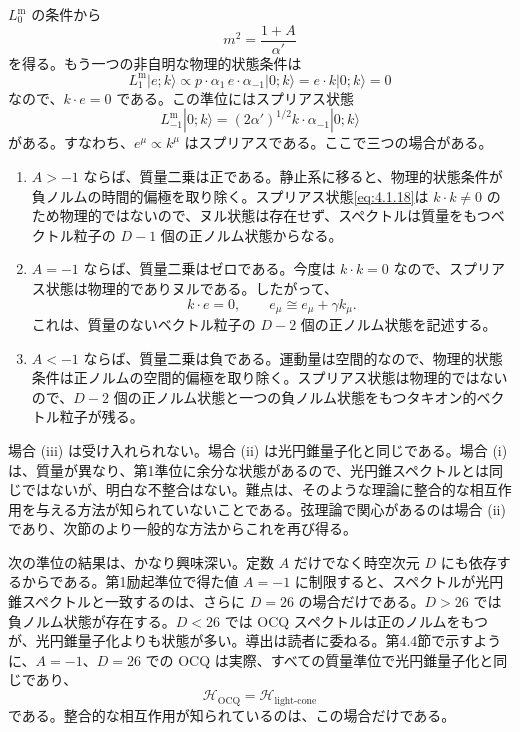 $L^{\mathrm m}_0$ の条件から
\begin{equation}
m^2=\frac{1+A}{\alpha'}
\tag{4.1.16}\label{eq:4.1.16}
\end{equation}
を得る。もう一つの非自明な物理的状態条件は
\begin{equation}
L^{\mathrm m}_1|e;k\rangle
\propto p\cdot\alpha_1\,e\cdot\alpha_{-1}|0;k\rangle
=e\cdot k|0;k\rangle=0
\tag{4.1.17}\label{eq:4.1.17}
\end{equation}
なので、$k\cdot e=0$ である。この準位にはスプリアス状態
\begin{equation}
L^{\mathrm m}_{-1}|0;k\rangle=(2\alpha')^{1/2}k\cdot\alpha_{-1}|0;k\rangle
\tag{4.1.18}\label{eq:4.1.18}
\end{equation}
がある。すなわち、$e^\mu\propto k^\mu$ はスプリアスである。ここで三つの場合がある。
\begin{enumerate}
\item[(i)] $A>-1$ ならば、質量二乗は正である。静止系に移ると、物理的状態条件が負ノルムの時間的偏極を取り除く。スプリアス状態\eqref{eq:4.1.18}は $k\cdot k\neq0$ のため物理的ではないので、ヌル状態は存在せず、スペクトルは質量をもつベクトル粒子の $D-1$ 個の正ノルム状態からなる。
\item[(ii)] $A=-1$ ならば、質量二乗はゼロである。今度は $k\cdot k=0$ なので、スプリアス状態は物理的でありヌルである。したがって、
\begin{equation}
k\cdot e=0,\qquad e_\mu\cong e_\mu+\gamma k_\mu.
\tag{4.1.19}\label{eq:4.1.19}
\end{equation}
これは、質量のないベクトル粒子の $D-2$ 個の正ノルム状態を記述する。
\item[(iii)] $A<-1$ ならば、質量二乗は負である。運動量は空間的なので、物理的状態条件は正ノルムの空間的偏極を取り除く。スプリアス状態は物理的ではないので、$D-2$ 個の正ノルム状態と一つの負ノルム状態をもつタキオン的ベクトル粒子が残る。
\end{enumerate}
場合 (iii) は受け入れられない。場合 (ii) は光円錐量子化と同じである。場合 (i) は、質量が異なり、第1準位に余分な状態があるので、光円錐スペクトルとは同じではないが、明白な不整合はない。難点は、そのような理論に整合的な相互作用を与える方法が知られていないことである。弦理論で関心があるのは場合 (ii) であり、次節のより一般的な方法からこれを再び得る。

次の準位の結果は、かなり興味深い。定数 $A$ だけでなく時空次元 $D$ にも依存するからである。第1励起準位で得た値 $A=-1$ に制限すると、スペクトルが光円錐スペクトルと一致するのは、さらに $D=26$ の場合だけである。$D>26$ では負ノルム状態が存在する。$D<26$ では OCQ スペクトルは正のノルムをもつが、光円錐量子化よりも状態が多い。導出は読者に委ねる。第4.4節で示すように、$A=-1$、$D=26$ での OCQ は実際、すべての質量準位で光円錐量子化と同じであり、
\begin{equation}
\mathcal H_{\mathrm{OCQ}}=\mathcal H_{\text{light-cone}}
\tag{4.1.20}\label{eq:4.1.20}
\end{equation}
である。整合的な相互作用が知られているのは、この場合だけである。

